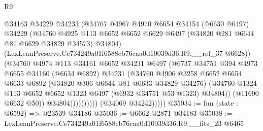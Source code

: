 \begin{lexlean}{R9}
\begin{coremodule}
                              @34163
                              @34229
                              @34233
                              (@34767
                                @4967
                                @4970
                                @6654
                                @34154
                                (@6630 @6497)
                                @34229
                                (@34760
                                  @4925
                                  @113
                                  @6652
                                  @6652
                                  @6629
                                  @6497
                                  (@34820 @281 @6644 @81 @6629 @34829 @34573)
                                  @34804)
                                (LexLeanPreserve.Ce734249a01f6588cb76caa0d10039d36.R9.__rel_37
                                  @6628))
                              (@34760
                                @4974
                                @113
                                @34161
                                @6652
                                @34231
                                @6497
                                (@6737
                                  @34751
                                  @394
                                  @4973
                                  @6655
                                  @34160
                                  (@6634 @6892)
                                  @34231
                                  (@34760
                                    @4906
                                    @3258
                                    @6652
                                    @6654
                                    @6633
                                    @6892
                                    (@34820 @306 @6644 @81 @6633 @34829 @34276)
                                    (@34760
                                      @1324
                                      @113
                                      @6652
                                      @6652
                                      @1323
                                      @6497
                                      (@6932 @34751 @53 @1323)
                                      @34804))
                                  (@11690 @6632 @50))
                                @34804))))))))))
            (@34069 @34242)))))
@35034 := fun (state : @6592) => @23539 @34186
@35036 := @6662 @2871 @34183
@35038 := LexLeanPreserve.Ce734249a01f6588cb76caa0d10039d36.R9.__fits_23 @6465

\end{coremodule}
\end{lexlean}
